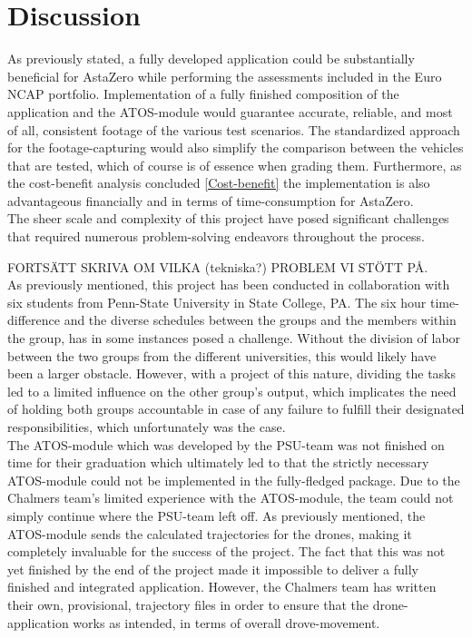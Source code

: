 \chapter{Discussion}

As previously stated, a fully developed application could be substantially beneficial for AstaZero while performing the assessments included in the Euro NCAP portfolio. Implementation of a fully finished composition of the application and the ATOS-module would guarantee accurate, reliable, and most of all, consistent footage of the various test scenarios. The standardized approach for the footage-capturing would also simplify the comparison between the vehicles that are tested, which of course is of essence when grading them. Furthermore, as the cost-benefit analysis concluded \ref{Cost-benefit} the implementation is also advantageous financially and in terms of time-consumption for AstaZero. 
\\

The sheer scale and complexity of this project have posed significant challenges that required numerous problem-solving endeavors throughout the process.

FORTSÄTT SKRIVA OM VILKA (tekniska?) PROBLEM VI STÖTT PÅ.
\\

As previously mentioned, this project has been conducted in collaboration with six students from Penn-State University in State College, PA. The six hour time-difference and the diverse schedules between the groups and the members within the group, has in some instances posed a challenge. Without the division of labor between the two groups from the different universities, this would likely have been a larger obstacle. However, with a project of this nature, dividing the tasks led to a limited influence on the other group's output, which implicates the need of holding both groups accountable in case of any failure to fulfill their designated responsibilities, which unfortunately was the case. 
\\

The ATOS-module which was developed by the PSU-team was not finished on time for their graduation which ultimately led to that the strictly necessary ATOS-module could not be implemented in the fully-fledged package. Due to the Chalmers team's limited experience with the ATOS-module, the team could not simply continue where the PSU-team left off. As previously mentioned, the ATOS-module sends the calculated trajectories for the drones, making it completely invaluable for the success of the project. The fact that this was not yet finished by the end of the project made it impossible to deliver a fully finished and integrated application. However, the Chalmers team has written their own, provisional, trajectory files in order to ensure that the drone-application works as intended, in terms of overall drove-movement. 
\\

